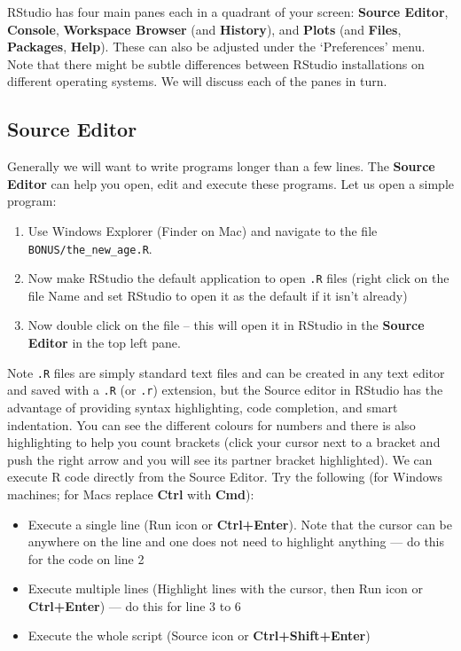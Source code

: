 \documentclass[]{book}
\providecommand{\tightlist}{%
  \setlength{\itemsep}{0pt}\setlength{\parskip}{0pt}}
\theoremstyle{definition}
\theoremstyle{definition}
\theoremstyle{definition}
\theoremstyle{remark}
\begin{document}
RStudio has four main panes each in a quadrant of your screen:
\textbf{Source Editor}, \textbf{Console}, \textbf{Workspace Browser}
(and \textbf{History}), and \textbf{Plots} (and \textbf{Files},
\textbf{Packages}, \textbf{Help}). These can also be adjusted under the
`Preferences' menu. Note that there might be subtle differences between
RStudio installations on different operating systems. We will discuss
each of the panes in turn.

\subsection{Source Editor}\label{source-editor}

Generally we will want to write programs longer than a few lines. The
\textbf{Source Editor} can help you open, edit and execute these
programs. Let us open a simple program:

\begin{enumerate}
\def\labelenumi{\arabic{enumi}.}
\item
  Use Windows Explorer (Finder on Mac) and navigate to the file
  \texttt{BONUS/the\_new\_age.R}.
\item
  Now make RStudio the default application to open \texttt{.R} files
  (right click on the file Name and set RStudio to open it as the
  default if it isn't already)
\item
  Now double click on the file -- this will open it in RStudio in the
  \textbf{Source Editor} in the top left pane.
\end{enumerate}

Note \texttt{.R} files are simply standard text files and can be created
in any text editor and saved with a \texttt{.R} (or \texttt{.r})
extension, but the Source editor in RStudio has the advantage of
providing syntax highlighting, code completion, and smart indentation.
You can see the different colours for numbers and there is also
highlighting to help you count brackets (click your cursor next to a
bracket and push the right arrow and you will see its partner bracket
highlighted). We can execute R code directly from the Source Editor. Try
the following (for Windows machines; for Macs replace \textbf{Ctrl} with
\textbf{Cmd}):

\begin{itemize}
\tightlist
\item
  Execute a single line (Run icon or \textbf{Ctrl+Enter}). Note that the
  cursor can be anywhere on the line and one does not need to highlight
  anything --- do this for the code on line 2
\item
  Execute multiple lines (Highlight lines with the cursor, then Run icon
  or \textbf{Ctrl+Enter}) --- do this for line 3 to 6
\item
  Execute the whole script (Source icon or \textbf{Ctrl+Shift+Enter})
\end{itemize}
\end{document}
